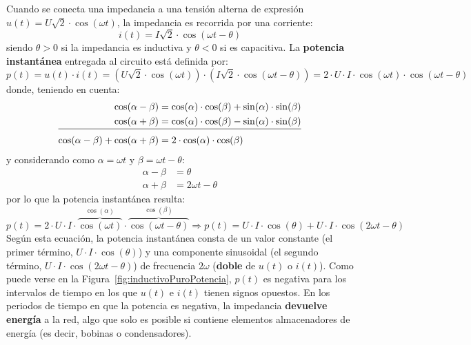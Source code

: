 Cuando se conecta una impedancia a una tensión alterna de expresión
$u(t) = U\sqrt{2} \cdot\cos (\omega t)$, la impedancia es recorrida
por una corriente:
\begin{equation*}
  i(t) = I\sqrt{2} \cdot \cos (\omega t -\theta)
\end{equation*}
siendo $\theta>0$ si la impedancia es inductiva y $\theta<0$ si es
capacitiva. La \textbf{potencia instantánea} entregada al circuito
está definida por:
\begin{equation*}
  p(t)=u(t)\cdot i(t)=\left(U\sqrt{2}\cdot \cos (\omega t) \right)\cdot \left(I\sqrt{2} \cdot \cos (\omega t -\theta)\right)=2\cdot U\cdot I\cdot \cos(\omega t)\cdot\cos(\omega t-\theta)
\end{equation*}
donde, teniendo en cuenta:
\begin{align*}
  \cos(\alpha-\beta)&=\cos(\alpha)\cdot\cos(\beta)+\sin(\alpha)\cdot\sin(\beta)\\
  \cos(\alpha+\beta)&=\cos(\alpha)\cdot\cos(\beta)-\sin(\alpha)\cdot\sin(\beta)\\[-10pt]
  \cline{1-2}
  \cos(\alpha-\beta)+\cos(\alpha+\beta)&=2\cdot\cos(\alpha)\cdot\cos(\beta)%
\end{align*}
y considerando como $\alpha=\omega t$ y $\beta=\omega t-\theta$:
\begin{align*}
  \alpha-\beta&=\theta\\
  \alpha +\beta&=2\omega t-\theta
\end{align*}
por lo que la potencia instantánea resulta:
\begin{equation}\label{eq:pot_inst}
  p(t)=2\cdot U\cdot I\cdot \overbrace{\cos(\omega t)}^{\cos(\alpha)}\cdot\overbrace{\cos(\omega t-\theta)}^{\cos(\beta)}\Rightarrow \boxed{p(t)
    =U\cdot I \cdot \cos(\theta)+U\cdot I \cdot\cos(2\omega t-\theta)}
\end{equation}
Según esta ecuación, la potencia instantánea consta de un {valor
  constante} (el primer término, $U\cdot I\cdot \cos(\theta)$) y una
componente sinusoidal (el segundo término,
$U\cdot I\cdot \cos(2 \omega t-\theta)$) de frecuencia $2\omega$
(\textbf{doble} de $u(t)$ o $i(t)$). Como puede verse en la
Figura~\ref{fig:inductivoPuroPotencia}, $p(t)$ es negativa para los
intervalos de tiempo en los que $u(t)$ e $i(t)$ tienen signos
opuestos. En los periodos de tiempo en que la potencia es negativa, la
impedancia \textbf{devuelve energía} a la red, algo que solo es
posible si contiene elementos almacenadores de energía (es decir,
bobinas o condensadores).
	
